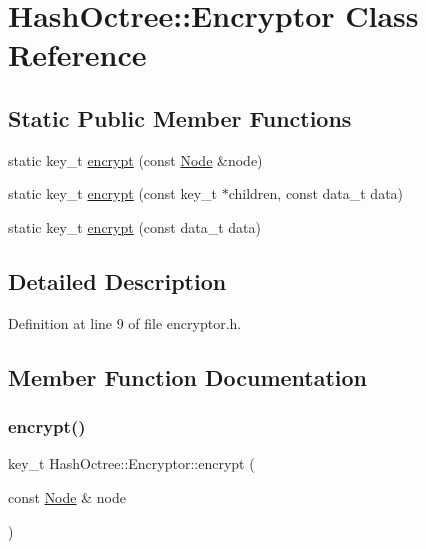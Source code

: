 \hypertarget{class_hash_octree_1_1_encryptor}{}\section{Hash\+Octree\+::Encryptor Class Reference}
\label{class_hash_octree_1_1_encryptor}
\subsection*{Static Public Member Functions}
\begin{DoxyCompactItemize}
\item 
static key\+\_\+t \mbox{\hyperlink{class_hash_octree_1_1_encryptor_a02e1c9d854ee1d296cee98776e098fe5_a02e1c9d854ee1d296cee98776e098fe5}{encrypt}} (const \mbox{\hyperlink{class_hash_octree_1_1_node}{Node}} \&node)
\item 
static key\+\_\+t \mbox{\hyperlink{class_hash_octree_1_1_encryptor_a876ac1e54cec1e396a89857b0c3cd5be_a876ac1e54cec1e396a89857b0c3cd5be}{encrypt}} (const key\+\_\+t $\ast$children, const data\+\_\+t data)
\item 
static key\+\_\+t \mbox{\hyperlink{class_hash_octree_1_1_encryptor_ac1fe3652c0462bd989d38f3ba316c258_ac1fe3652c0462bd989d38f3ba316c258}{encrypt}} (const data\+\_\+t data)
\end{DoxyCompactItemize}


\subsection{Detailed Description}


Definition at line 9 of file encryptor.\+h.



\subsection{Member Function Documentation}
\mbox{\label{class_hash_octree_1_1_encryptor_a02e1c9d854ee1d296cee98776e098fe5_a02e1c9d854ee1d296cee98776e098fe5}} 
\subsubsection{\texorpdfstring{encrypt()}{encrypt()}\hspace{0.1cm}{\footnotesize\ttfamily [1/3]}}
{\footnotesize\ttfamily key\+\_\+t Hash\+Octree\+::\+Encryptor\+::encrypt (\begin{DoxyParamCaption}\item[{const \mbox{\hyperlink{class_hash_octree_1_1_node}{Node}} \&}]{node }\end{DoxyParamCaption})\hspace{0.3cm}{\ttfamily [static]}}

